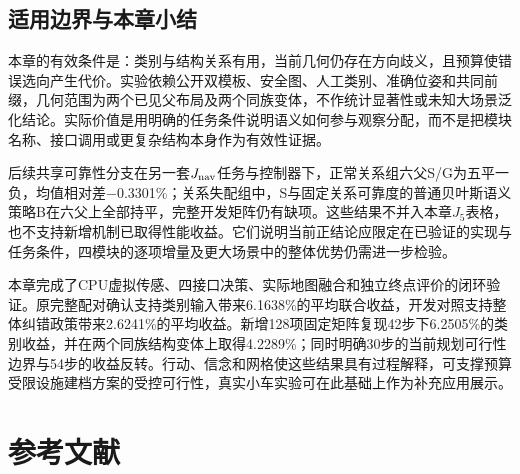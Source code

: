 \documentclass[11pt,a4paper]{article}
\begin{document}
\hypertarget{ux9002ux7528ux8fb9ux754cux4e0eux672cux7ae0ux5c0fux7ed3}{%
\subsection{适用边界与本章小结}\label{ux9002ux7528ux8fb9ux754cux4e0eux672cux7ae0ux5c0fux7ed3}}

本章的有效条件是：类别与结构关系有用，当前几何仍存在方向歧义，且预算使错误选向产生代价。实验依赖公开双模板、安全图、人工类别、准确位姿和共同前缀，几何范围为两个已见父布局及两个同族变体，不作统计显著性或未知大场景泛化结论。实际价值是用明确的任务条件说明语义如何参与观察分配，而不是把模块名称、接口调用或更复杂结构本身作为有效性证据。

后续共享可靠性分支在另一套\(J_{\rm nav}\)任务与控制器下，正常关系组六父S/G为五平一负，均值相对差−0.3301\%；关系失配组中，S与固定关系可靠度的普通贝叶斯语义策略B在六父上全部持平，完整开发矩阵仍有缺项。这些结果不并入本章\(J_5\)表格，也不支持新增机制已取得性能收益。它们说明当前正结论应限定在已验证的实现与任务条件，四模块的逐项增量及更大场景中的整体优势仍需进一步检验。

本章完成了CPU虚拟传感、四接口决策、实际地图融合和独立终点评价的闭环验证。原完整配对确认支持类别输入带来6.1638\%的平均联合收益，开发对照支持整体纠错政策带来2.6241\%的平均收益。新增128项固定矩阵复现42步下6.2505\%的类别收益，并在两个同族结构变体上取得4.2289\%；同时明确30步的当前规划可行性边界与54步的收益反转。行动、信念和网格使这些结果具有过程解释，可支撑预算受限设施建档方案的受控可行性，真实小车实验可在此基础上作为补充应用展示。

\hypertarget{ux53c2ux8003ux6587ux732e}{%
\section*{参考文献}\label{ux53c2ux8003ux6587ux732e}}
\end{document}
